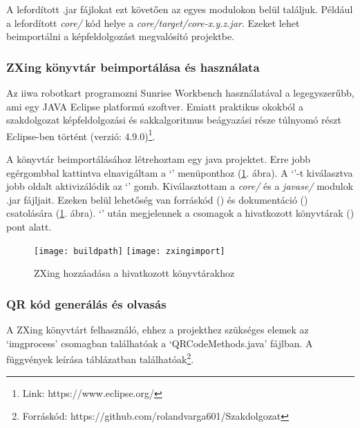\documentclass[../documentation.tex]{subfiles}
\begin{document}
A lefordított .jar fájlokat ezt követően az egyes modulokon belül találjuk. Például a lefordított \textit{core/} kód helye a \textit{core/target/core-x.y.z.jar}. Ezeket lehet beimportálni a képfeldolgozást megvalósító projektbe.

\subsubsection{ZXing könyvtár beimportálása és használata}
Az iiwa robotkart programozni Sunrise Workbench használatával a legegyszerűbb, ami egy JAVA Eclipse platformú szoftver. Emiatt praktikus okokból a szakdolgozat képfeldolgozási és sakkalgoritmus beágyazási része túlnyomó részt Eclipse-ben történt (verzió: 4.9.0)\footnote{Link: https://www.eclipse.org/}.

A könyvtár beimportálásához létrehoztam egy java projektet. Erre jobb egérgombbal kattintva elnavigáltam a `' menüponthoz (\ref{fig:zxingimport}. ábra). A `'-t kiválasztva jobb oldalt aktivizálódik az `' gomb. Kiválasztottam a \textit{core/} és a \textit{javase/} modulok .jar fájljait. Ezeken belül lehetőség van forráskód () és dokumentáció () csatolására (\ref{fig:zxingimport}. ábra). `' után megjelennek a csomagok a hivatkozott könyvtárak () pont alatt.

\begin{figure}[h]
\centering
\texttt{[image: buildpath]}
\texttt{[image: zxingimport]}
\caption{ZXing hozzáadása a hivatkozott könyvtárakhoz}
\label{fig:zxingimport}
\end{figure}

\subsubsection{QR kód generálás és olvasás}
A ZXing könyvtárt felhasználó, ehhez a projekthez szükséges elemek az `imgprocess' csomagban találhatóak a `QRCodeMethods.java' fájlban. A függvények leírása   táblázatban találhatóak\footnote{Forráskód: https://github.com/rolandvarga601/Szakdolgozat}. 
\end{document}
